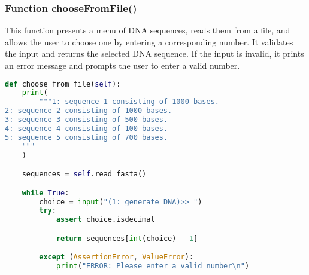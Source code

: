 \documentclass[11pt]{article}
\begin{document}
\subsubsection{Function chooseFromFile()}
This function presents a menu of DNA sequences, reads them from a file, and allows the user to choose one by entering a corresponding number. It validates the input and returns the selected DNA sequence. If the input is invalid, it prints an error message and prompts the user to enter a valid number.

\begin{lstlisting}[language=Python, style=PythonStyle]
def choose_from_file(self):
    print(
        """1: sequence 1 consisting of 1000 bases.
2: sequence 2 consisting of 1000 bases.
3: sequence 3 consisting of 500 bases.
4: sequence 4 consisting of 100 bases.
5: sequence 5 consisting of 700 bases.
    """
    )

    sequences = self.read_fasta()

    while True:
        choice = input("(1: generate DNA)>> ")
        try:
            assert choice.isdecimal

            return sequences[int(choice) - 1]

        except (AssertionError, ValueError):
            print("ERROR: Please enter a valid number\n")
\end{lstlisting}
\end{document}
